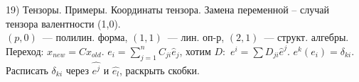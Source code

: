 19) Тензоры. Примеры. Координаты тензора. Замена переменной – случай тензора валентности (1,0).\\
$(p,0)$~--- полилин. форма, $(1, 1)$~--- лин. оп-р, $(2, 1)$~--- структ. алгебры. Переход: $x_{new} = Cx_{old}$. $e_i=\sum_{j=1}^nC_{ji}\hat{e}_j$, хотим $D:$ $e^i=\sum D_{ji}\hat{e}^j$. $e^k(e_i)=\delta_{ki}$. Расписать $\delta_{ki}$ через $\hat{e^j}$ и $\hat{e_l}$, раскрыть скобки.
